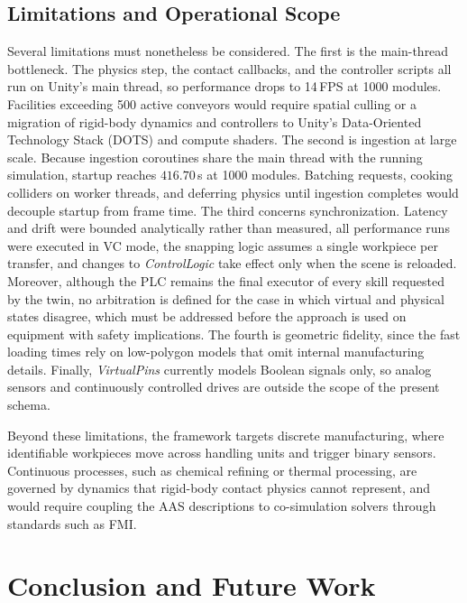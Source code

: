 \documentclass{ieeeojies}
\begin{document}
\subsection{Limitations and Operational Scope}
\label{sec:disc_limitations}

Several limitations must nonetheless be considered. The first is the main-thread bottleneck. The physics step, the contact callbacks, and the controller scripts all run on Unity's main thread, so performance drops to 14\,FPS at 1000 modules. Facilities exceeding 500 active conveyors would require spatial culling or a migration of rigid-body dynamics and controllers to Unity's Data-Oriented Technology Stack (DOTS) and compute shaders. The second is ingestion at large scale. Because ingestion coroutines share the main thread with the running simulation, startup reaches $416.70$\,s at 1000 modules. Batching requests, cooking colliders on worker threads, and deferring physics until ingestion completes would decouple startup from frame time. The third concerns synchronization. Latency and drift were bounded analytically rather than measured, all performance runs were executed in VC mode, the snapping logic assumes a single workpiece per transfer, and changes to \textit{ControlLogic} take effect only when the scene is reloaded. Moreover, although the PLC remains the final executor of every skill requested by the twin, no arbitration is defined for the case in which virtual and physical states disagree, which must be addressed before the approach is used on equipment with safety implications. The fourth is geometric fidelity, since the fast loading times rely on low-polygon models that omit internal manufacturing details. Finally, \textit{VirtualPins} currently models Boolean signals only, so analog sensors and continuously controlled drives are outside the scope of the present schema.

Beyond these limitations, the framework targets discrete manufacturing, where identifiable workpieces move across handling units and trigger binary sensors. Continuous processes, such as chemical refining or thermal processing, are governed by dynamics that rigid-body contact physics cannot represent, and would require coupling the AAS descriptions to co-simulation solvers through standards such as FMI.

\section{Conclusion and Future Work}
\label{sec:conclusion}
\end{document}
